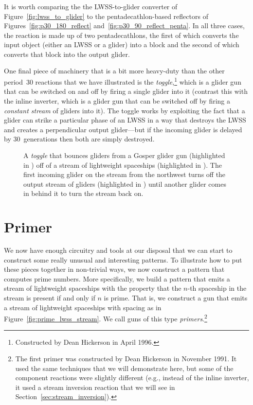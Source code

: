 It is worth comparing the the LWSS-to-glider converter of Figure~\ref{fig:lwss_to_glider} to the pentadecathlon-based reflectors of Figures~\ref{fig:p30_180_reflect} and~\ref{fig:p30_90_reflect_penta}. In all three cases, the reaction is made up of two pentadecathlons, the first of which converts the input object (either an LWSS or a glider) into a block and the second of which converts that block into the output glider.

One final piece of machinery that is a bit more heavy-duty than the other period~$30$ reactions that we have illustrated is the \emph{toggle},\footnote{Constructed by Dean Hickerson in April 1996.} which is a glider gun that can be switched on and off by firing a single glider into it (contrast this with the inline inverter, which is a glider gun that can be switched off by firing a \emph{constant stream} of gliders into it). The toggle works by exploiting the fact that a glider can strike a particular phase of an LWSS in a way that destroys the LWSS and creates a perpendicular output glider---but if the incoming glider is delayed by $30$~generations then both are simply destroyed.

\begin{figure}[!htb]
	\centering
	\caption{A \emph{toggle} that bounces gliders from a Gosper glider gun (highlighted in ) off of a stream of lightweight spaceships (highlighted in ). The first incoming glider on the  stream from the northwest turns off the output stream of gliders (highlighted in ) until another glider comes in behind it to turn the stream back on.}
	\label{fig:toggle}
\end{figure}


\section{Primer}\label{sec:primer}

We now have enough circuitry and tools at our disposal that we can start to construct some really unusual and interesting patterns. To illustrate how to put these pieces together in non-trivial ways, we now construct a pattern that computes prime numbers. More specifically, we build a pattern that emits a stream of lightweight spaceships with the property that the $n$-th spaceship in the stream is present if and only if $n$ is prime. That is, we construct a gun that emits a stream of lightweight spaceships with spacing as in Figure~\ref{fig:prime_lwss_stream}. We call guns of this type \emph{primers}.\footnote{The first primer was constructed by Dean Hickerson in November 1991. It used the same techniques that we will demonstrate here, but some of the component reactions were slightly different (e.g., instead of the inline inverter, it used a stream inversion reaction that we will see in Section~\ref{sec:stream_inversion}).}

